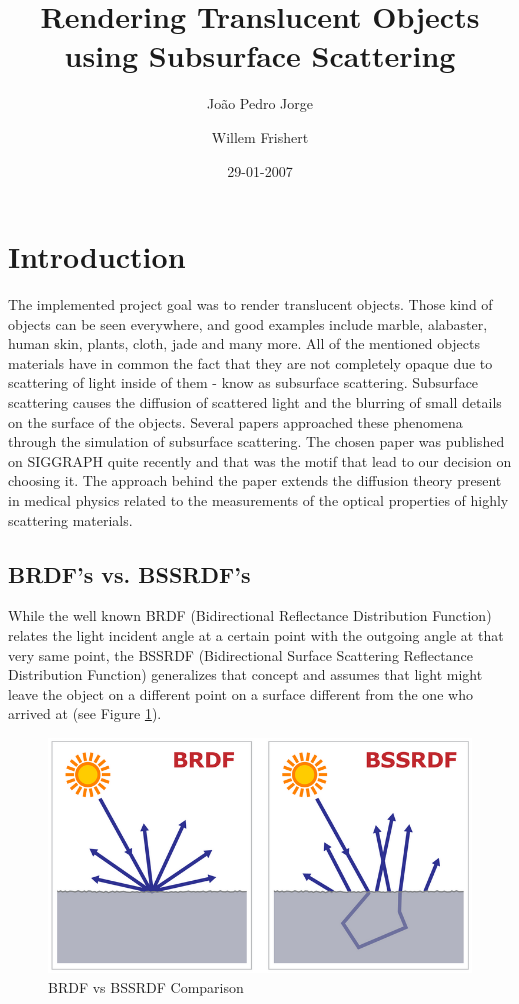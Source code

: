 \documentclass{article}
\title{Rendering Translucent Objects using Subsurface Scattering}
\author{Jo\~{a}o Pedro Jorge \and Willem Frishert}
\date{29-01-2007}
\begin{document}
\maketitle

\section{Introduction}
The implemented project goal was to render translucent objects. Those kind of objects can be seen everywhere, and good examples include marble, alabaster, human skin, plants, cloth, jade and many more.
All of the mentioned objects materials have in common the fact that they are not completely opaque due to scattering of light inside of them - know as subsurface scattering. Subsurface scattering causes the diffusion of scattered light and the blurring of small details on the surface of the objects.
Several papers approached these phenomena through the simulation of subsurface scattering. The chosen paper \cite{HierarchicalSSS} was published on SIGGRAPH quite recently and that was the motif that lead to our decision on choosing it. The approach behind the paper extends the diffusion theory present in medical physics related to the measurements of the optical properties of highly scattering materials.


\subsection{BRDF's vs. BSSRDF's}

While the well known BRDF (Bidirectional Reflectance Distribution Function) relates the light incident angle at a certain point with the outgoing angle at that very same point, the BSSRDF (Bidirectional Surface Scattering Reflectance Distribution Function) generalizes that concept and assumes that light might leave the object on a different point on a surface different from the one who arrived at (see Figure \ref{bssrdf_brdf}).

\begin{figure}[hbtp]
  \begin{center}
	\includegraphics[scale=0.5]{./Pictures/BSSRDF_BRDF.png}
    \caption{BRDF vs BSSRDF Comparison}
    \label{bssrdf_brdf}
  \end{center}
\end{figure}
\end{document}
